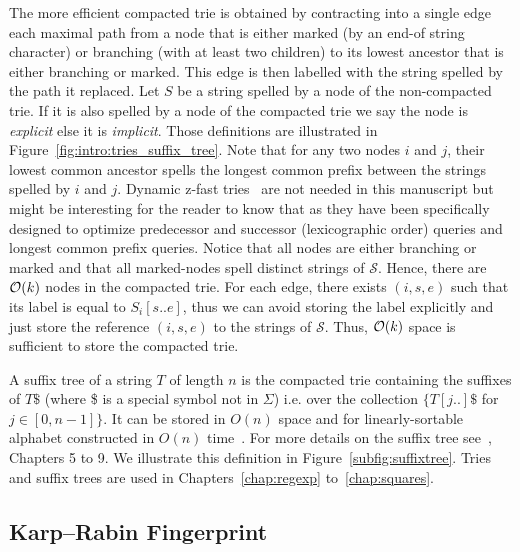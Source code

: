The more efficient compacted trie is obtained by contracting  into a single edge each maximal path from a node that is either marked (by an end-of string character) or branching (with at least two children) to its lowest ancestor that is either branching or marked.
This edge is then labelled with the string spelled by the path it replaced.
Let $S$ be a string spelled by a node of the non-compacted trie. If it is also spelled by a node of the compacted trie we say the node is \emph{explicit} else it is \emph{implicit}. Those definitions are illustrated in Figure~\ref{fig:intro:tries_suffix_tree}. Note that for any two nodes $i$ and $j$, their lowest common ancestor spells the longest common prefix between the strings spelled by $i$ and $j$.
Dynamic z-fast tries~\cite{belazzougui2010dynamic} are not needed in this manuscript but might be interesting for the reader to know that as they have been specifically designed to optimize predecessor and successor (lexicographic order) queries and longest common prefix queries.
%
Notice that all nodes are either branching or marked and that all marked-nodes spell distinct strings of $\mathcal{S}$. 
Hence, there are $\mathcal{O}(k)$ nodes in the compacted trie.
For each edge, there exists $(i,s,e)$ such that its label is equal to $S_i[s .. e]$, thus we can avoid storing the label explicitly and just store the reference $(i,s,e)$ to the strings of $\mathcal{S}$.
Thus, $\mathcal{O}(k)$ space is sufficient to store the compacted trie.

A suffix tree of a string $T$ of length $n$ is the compacted trie containing the suffixes of $T\$$ (where \$ is a special symbol not in $\Sigma$) i.e. over the collection $\{T[j..]\$$ for $ j \in [0,n-1] \}$. It can be stored in $O(n)$ space and for linearly-sortable alphabet constructed in $O(n)$ time~\cite{Farach1997}. For more details on the suffix tree see~\cite{Gusfield1997}, Chapters 5 to 9. We illustrate this definition in Figure~\ref{subfig:suffixtree}. Tries and suffix trees are used in Chapters~\ref{chap:regexp} to~\ref{chap:squares}.



\subsection{Karp--Rabin Fingerprint}\label{sec:prelim:KR}

